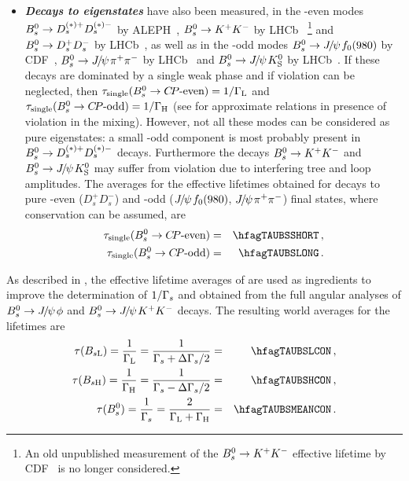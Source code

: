 \begin{itemize}
\item
{\bf\em Decays to \boldmath\CP eigenstates} have also 
been measured, in the \CP-even modes 
$B^0_s \to D_s^{(*)+}D_s^{(*)-}$ by ALEPH~\cite{Barate:2000kd},
$B^0_s \to K^+ K^-$ by LHCb~\cite{Aaij:2011kn,Aaij:2014fia,*Aaij:2012ns_cont}%
\footnote{An old unpublished measurement of the $B^0_s \to K^+ K^-$
effective lifetime by CDF~\cite{Tonelli:2006np} is no longer considered.}
and $B^0_s \to D_s^+D_s^-$ by LHCb~\cite{Aaij:2013bvd}, as well as in the \CP-odd modes 
$B^0_s \to {J\mskip -3mu/\mskip -2mu\psi\mskip 2mu} f_0(980)$ by CDF~\cite{Aaltonen:2011nk}, 
$B^0_s \to {J\mskip -3mu/\mskip -2mu\psi\mskip 2mu} \pi^+\pi^-$ by LHCb~\cite{Aaij:2013oba,*LHCb:2011aa_mod,*LHCb:2012ad_mod,*LHCb:2011ab_mod,*Aaij:2012nta_mod}
and $B^0_s \to {J\mskip -3mu/\mskip -2mu\psi\mskip 2mu} K^0_{\rm S}$ by LHCb~\cite{Aaij:2013eia}.
If these 
decays are dominated by a single weak phase and if \CP violation 
can be neglected, then $\tau_{\rm single}(\Bs \to \mbox{\CP-even}) = 1/\Gamma_{\rm L}$ 
and  $\tau_{\rm single}(\Bs \to \mbox{\CP-odd}) = 1/\Gamma_{\rm H}$ 
(see  for approximate relations in presence of
\CP violation in the mixing). 
However, not all these modes can be considered as pure \CP eigenstates:
a small \CP-odd component is most probably present
in $B^0_s \to D_s^{(*)+}D_s^{(*)-}$ decays. Furthermore the decays
$B^0_s \to K^+ K^-$ and $B^0_s \to {J\mskip -3mu/\mskip -2mu\psi\mskip 2mu} K^0_{\rm S}$ %
may suffer from \CP violation due to interfering tree and loop amplitudes. 
The averages for the effective lifetimes obtained for decays to
pure \CP-even ($D_s^+D_s^-$) and \CP-odd (${J\mskip -3mu/\mskip -2mu\psi\mskip 2mu} f_0(980)$, ${J\mskip -3mu/\mskip -2mu\psi\mskip 2mu} \pi^+\pi^-$)
final states, where \CP conservation can be assumed, are
\begin{eqnarray}
\tau_{\rm single}(\Bs \to \mbox{\CP-even}) & = & \hfagTAUBSSHORT \,,
\labe{tau_KK}
\\
\tau_{\rm single}(\Bs \to \mbox{\CP-odd}) & = & \hfagTAUBSLONG \,.
\labe{tau_Jpsif0}
\end{eqnarray}

\end{itemize}

As described in , 
the effective lifetime averages of 
are used as ingredients to improve the 
determination of $1/\Gamma_{s}$ and \DGs obtained from the full angular analyses
of $B^0_s\to {J\mskip -3mu/\mskip -2mu\psi\mskip 2mu}\phi$ and $B^0_s\to {J\mskip -3mu/\mskip -2mu\psi\mskip 2mu} K^+K^-$ decays. 
The resulting world averages for the \Bs lifetimes are
\begin{eqnarray}
\tau(\B_{s\rm L}) =
\frac{1}{\Gamma_{\rm L}} = \frac{1}{\Gs+\DGs/2} & = & \hfagTAUBSLCON \,, \\
\tau(\B_{s\rm H}) =
\frac{1}{\Gamma_{\rm H}} = \frac{1}{\Gs-\DGs/2} & = & \hfagTAUBSHCON \,, \\
\tau(\Bs) = \frac{1}{\Gs} = \frac{2}{\Gamma_{\rm L}+\Gamma_{\rm H}} & = & \hfagTAUBSMEANCON \,.
\labe{oneoverGs}
\end{eqnarray}

